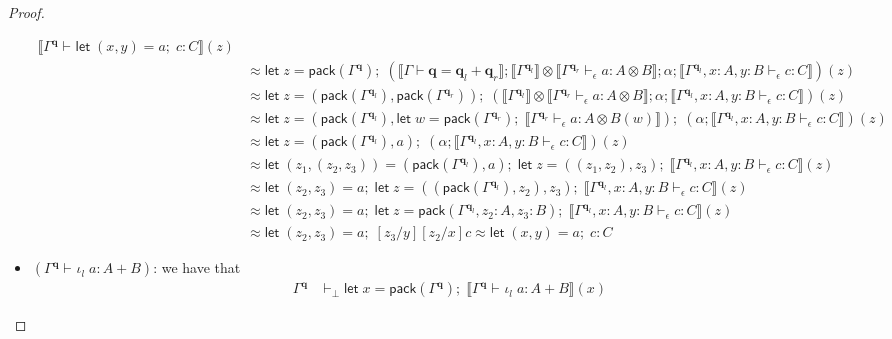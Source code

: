 \documentclass[acmsmall,screen,review]{acmart}
\newcommand{\mb}[1]{\ensuremath{\mathbf{#1}}}
\newcommand{\ms}[1]{\ensuremath{\mathsf{#1}}}
\newcommand{\linl}[1]{\iota_l\;{#1}}
\newcommand{\letexpr}[3]{\ensuremath{\ms{let}\;#1 = #2;\;#3}}
\newcommand{\qsp}[4]{#1 \vdash #2 = #3 + #4}
\newcommand{\hasty}[4]{#1 \vdash_{#2} #3: {#4}}
\newcommand{\dnt}[1]{\llbracket{#1}\rrbracket}
\begin{document}
\begin{proof}
\begin{itemize}
\begin{align*}
        {\dnt{\hasty{\Gamma^{\mb{q}}}{}{\letexpr{(x, y)}{a}{c}}{C}}(z)} \\
      &\approx
      \letexpr{z}{\ms{pack}(\Gamma^{\mb{q}})}{
        (\dnt{\qsp{\Gamma}{\mb{q}}{\mb{q}_l}{\mb{q}_r}}
        ; \dnt{\Gamma^{\mb{q}_l}} \otimes \dnt{\hasty{\Gamma^{\mb{q}_r}}{\epsilon}{a}{A \otimes B}}
        ; \alpha
        ; \dnt{\hasty{\Gamma^{\mb{q}_l}, x : A, y : B}{\epsilon}{c}{C}}
        )(z)
      } \\
      &\approx
      \letexpr{z}{(\ms{pack}(\Gamma^{\mb{q}_l}), \ms{pack}(\Gamma^{\mb{q}_r}))}{(
        \dnt{\Gamma^{\mb{q}_l}} \otimes \dnt{\hasty{\Gamma^{\mb{q}_r}}{\epsilon}{a}{A \otimes B}}
        ; \alpha
        ; \dnt{\hasty{\Gamma^{\mb{q}_l}, x : A, y : B}{\epsilon}{c}{C}}
        )(z)
      } \\
      &\approx
      \letexpr{z}{(\ms{pack}(\Gamma^{\mb{q}_l}), 
        \letexpr{w}{\ms{pack}(\Gamma^{\mb{q}_r})}
          {
            \dnt{\hasty{\Gamma^{\mb{q}_r}}{\epsilon}{a}{A \otimes B}(w)}
          }
        )
        }{(
        \alpha
        ; \dnt{\hasty{\Gamma^{\mb{q}_l}, x : A, y : B}{\epsilon}{c}{C}}
        )(z)
      } \\
      &\approx
      \letexpr{z}{(\ms{pack}(\Gamma^{\mb{q}_l}), a)
        }{(
        \alpha
        ; \dnt{\hasty{\Gamma^{\mb{q}_l}, x : A, y : B}{\epsilon}{c}{C}}
        )(z)
      }\\
      &\approx
      \letexpr{(z_1, (z_2, z_3))}{(\ms{pack}(\Gamma^{\mb{q}_l}), a)
        }{\letexpr{z}{((z_1, z_2), z_3)}  
          {\dnt{\hasty{\Gamma^{\mb{q}_l}, x : A, y : B}{\epsilon}{c}{C}}(z)}
      } \\
      &\approx
      \letexpr{(z_2, z_3)}{a}{\letexpr{z}{((\ms{pack}(\Gamma^{\mb{q}_l}), z_2), z_3)}  
          {\dnt{\hasty{\Gamma^{\mb{q}_l}, x : A, y : B}{\epsilon}{c}{C}}(z)}
      } \\
      &\approx
      \letexpr{(z_2, z_3)}{a}{\letexpr{z}{\ms{pack}(\Gamma^{\mb{q}_l}, z_2 : A, z_3 : B)}  
          {\dnt{\hasty{\Gamma^{\mb{q}_l}, x : A, y : B}{\epsilon}{c}{C}}(z)}
      }\\
      &\approx
      \letexpr{(z_2, z_3)}{a}{[z_3/y][z_2/x]c}
      \approx
      \letexpr{(x, y)}{a}{c} : C
    \end{align*}
    \item $(\hasty{\Gamma^{\mb{q}}}{}{\linl{a}}{A + B})$: we have that
    \begin{align*}
    \Gamma^{\mb{q}} &\vdash_\bot
      \letexpr{x}{\ms{pack}(\Gamma^{\mb{q}})}{\dnt{\hasty{\Gamma^{\mb{q}}}{}{\linl{a}}{A + B}}(x)}

\end{align*}
\end{itemize}
\end{proof}
\end{document}
